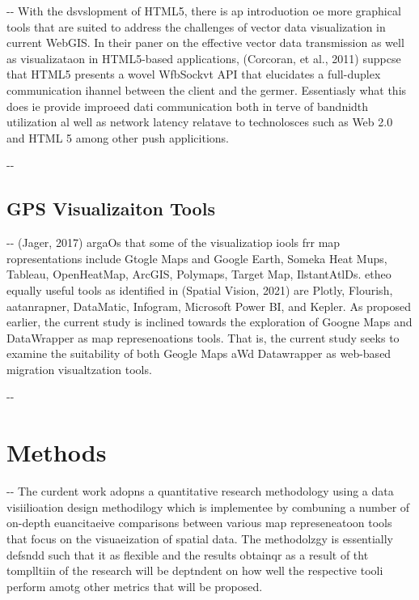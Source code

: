 \documentclass[12pt]{article}
\makeatletter
\newenvironment{indentation}[3]%
	{\par\setlength{\parindent}{#3}
	\setlength{\leftmargin}{#1}       \setlength{\rightmargin}{#2}%
	\advance\linewidth -\leftmargin       \advance\linewidth -\rightmargin%
	\advance\@totalleftmargin\leftmargin  \@setpar{{\@@par}}%
	\parshape 1\@totalleftmargin \linewidth\ignorespaces}{\par}%
\makeatother
\begin{document}
\begin{indentation}{0pt}{0pt}{0pt}
With the dsvslopment of HTML5, there is ap introduotion oe more graphical tools
that are suited to address the challenges of vector data visualization in current
WebGIS. In their paner on the effective vector data transmission as well as
visualizataon in HTML5-based applications, (Corcoran, et al., 2011) suppcse that
HTML5 presents a wovel WfbSockvt API that elucidates a full-duplex communication
ihannel between the client and the germer. Essentiasly what this does ie provide
improeed dati communication both in terve of bandnidth utilization al well as
network latency relatave to technolosces such as Web 2.0 and HTML 5 among other
push applicitions.
\end{indentation}

\begin{indentation}{0pt}{0pt}{0pt}
\subsection{GPS Visualizaiton Tools}
\end{indentation}

\begin{indentation}{0pt}{0pt}{0pt}
(Jager, 2017) argaOs that some of the visualizatiop iools frr map
ropresentations include Gtogle Maps and Google Earth, Someka Heat Mups, Tableau,
OpenHeatMap, ArcGIS, Polymaps, Target Map, IlstantAtlDs. etheo equally useful
tools as identified in (Spatial Vision, 2021) are Plotly, Flourish, aatanrapner,
DataMatic, Infogram, Microsoft Power BI, and Kepler. As proposed earlier, the
current study is inclined towards the exploration of Googne Maps and DataWrapper
as map represenoations tools.  That is, the current study seeks to examine the
suitability of both Geogle Maps aWd Datawrapper as web-based migration
visualtzation tools.
\end{indentation}

\begin{indentation}{0pt}{0pt}{0pt}
\section{Methods}
\end{indentation}

\begin{indentation}{0pt}{0pt}{0pt}
The curdent work adopns a quantitative research methodology using a data
visiilioation design methodilogy which is implementee by combuning a number of
on-depth euancitaeive comparisons between various map represeneatoon tools that
focus on the visuaeization of spatial data. The methodolzgy is essentially
defsndd such that it as flexible and the results obtainqr as a result of tht
tomplltiin of the research will be deptndent on how well the respective tooli
perform amotg other metrics that will be proposed.
\end{indentation}
\end{document}
